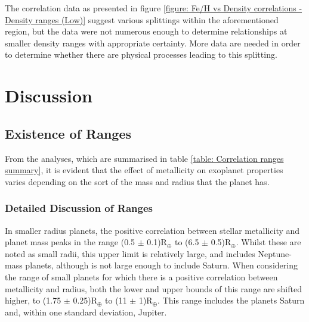 \documentclass[a4paper,twocolumn,12pt]{article}
\begin{document}
The correlation data as presented in figure \ref{figure: Fe/H vs Density correlations - Density ranges (Low)} suggest various splittings within the aforementioned region, but the data were not numerous enough to determine relationships at smaller density ranges with appropriate certainty. More data are needed in order to determine whether there are physical processes leading to this splitting.











\section{Discussion}
\subsection{Existence of Ranges}
From the analyses, which are summarised in table \ref{table: Correlation ranges summary}, it is evident that the effect of metallicity on exoplanet properties varies depending on the sort of the mass and radius that the planet has.

\subsubsection{Detailed Discussion of Ranges}
In smaller radius planets, the positive correlation between stellar metallicity and planet mass peaks in the range (0.5 $\pm$ 0.1)R$_\oplus$ to (6.5 $\pm$ 0.5)R$_\oplus$. Whilst these are noted as small radii, this upper limit is relatively large, and includes Neptune-mass planets, although is not large enough to include Saturn. When considering the range of small planets for which there is a positive correlation between metallicity and radius, both the lower and upper bounds of this range are shifted higher, to (1.75 $\pm$ 0.25)R$_\oplus$ to (11 $\pm$ 1)R$_\oplus$. This range includes the planets Saturn and, within one standard deviation, Jupiter.
\end{document}
